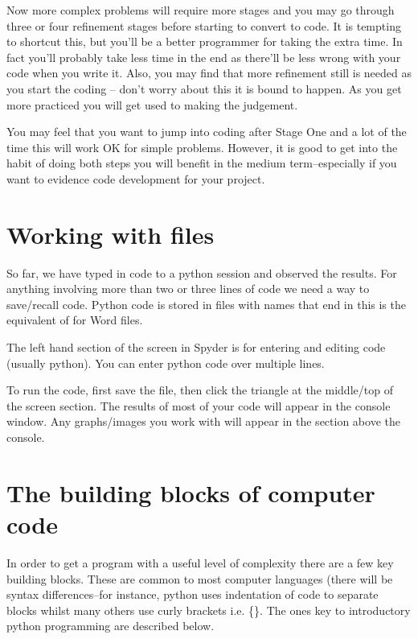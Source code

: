 \documentclass[letterpaper,10pt,english]{jupyterBook}
\begin{document}
\sphinxAtStartPar
Now more complex problems will require more stages and you may go through three or four refinement stages before starting to convert to code. It is tempting to shortcut this, but you’ll be a better programmer for taking the extra time. In fact you’ll probably take less time in the end as there’ll be less wrong with your code when you write it. Also, you may find that more refinement still is needed as you start the coding – don’t worry about this it is bound to happen. As you get more practiced you will get used to making the judgement.

\sphinxAtStartPar
You may feel that you want to jump into coding after Stage One and a lot of the time this will work OK for simple problems. However, it is good to get into the habit of doing both steps you will benefit in the medium term–especially if you want to evidence code development for your project.


\section{Working with files}
\label{\detokenize{ProgInPython:working-with-files}}
\sphinxAtStartPar
So far, we have typed in code to a python session and observed the results. For anything involving more than two or three lines of code we need a way to save/recall code. Python code is stored in files with names that end in  \sphinxhyphen{} this is the equivalent of  for Word files.

\sphinxAtStartPar
The left hand section of the screen in Spyder is for entering and editing code (usually python). You can enter python code over multiple lines.

\sphinxAtStartPar
To run the code, first save the file, then click the triangle at the middle/top of the screen section. The results of most of your code will appear in the console window. Any graphs/images you work with will appear in the section above the console.


\section{The building blocks of computer code}
\label{\detokenize{ProgInPython:the-building-blocks-of-computer-code}}
\sphinxAtStartPar
In order to get a program with a useful level of complexity there are a few key building blocks. These are common to most computer languages (there will be syntax differences–for instance, python uses indentation of code to separate blocks whilst many others use curly brackets i.e. \{\}. The ones key to introductory python programming are described below.
\end{document}

